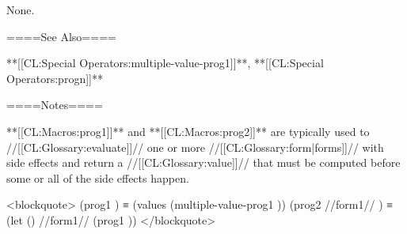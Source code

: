 None.

====See Also====

**[[CL:Special Operators:multiple-value-prog1]]**, **[[CL:Special Operators:progn]]**

====Notes====

**[[CL:Macros:prog1]]** and **[[CL:Macros:prog2]]** are typically used to //[[CL:Glossary:evaluate]]// one or more //[[CL:Glossary:form|forms]]// with side effects and return a //[[CL:Glossary:value]]// that must be computed before some or all of the side effects happen.

<blockquote> (prog1 ) ≡ (values (multiple-value-prog1 )) (prog2 //form1// ) ≡ (let () //form1// (prog1 )) </blockquote>

